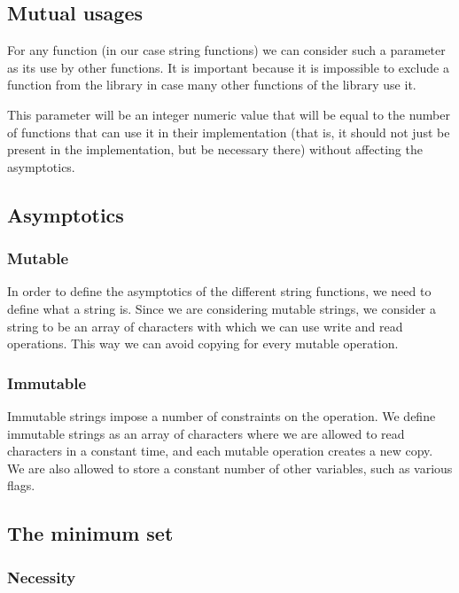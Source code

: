 \documentclass[anonymous,sigplan,review,11pt,nonacm,natbib=false]{acmart}
\begin{document}
    \subsection{Mutual usages}

    For any function (in our case string functions) we can consider such a parameter as its use by other functions. It is important because it is impossible to exclude a function from the library in case many other functions of the library use it.

    This parameter will be an integer numeric value that will be equal to the number of functions that can use it in their implementation (that is, it should not just be present in the implementation, but be necessary there) without affecting the asymptotics.

    \subsection{Asymptotics}

    \subsubsection{Mutable}

    In order to define the asymptotics of the different string functions, we need to define what a string is. Since we are considering mutable strings, we consider a string to be an array of characters with which we can use write and read operations. This way we can avoid copying for every mutable operation.

    \subsubsection{Immutable}

    Immutable strings impose a number of constraints on the operation. We define immutable strings as an array of characters where we are allowed to read characters in a constant time, and each mutable operation creates a new copy. We are also allowed to store a constant number of other variables, such as various flags.

    \subsection{The minimum set}

    \subsubsection{Necessity}
\end{document}
